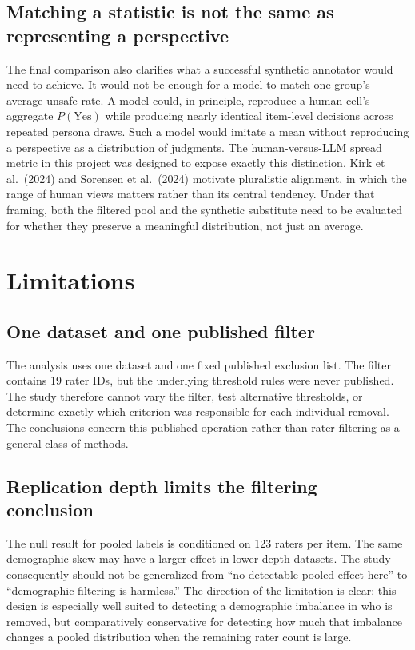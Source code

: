 \documentclass[11pt,a4paper]{article}
\begin{document}
\subsection{Matching a statistic is not the same as representing a perspective}

The final comparison also clarifies what a successful synthetic annotator would need to achieve.
It would not be enough for a model to match one group's average unsafe rate. A model could, in
principle, reproduce a human cell's aggregate $P(\text{Yes})$ while producing nearly identical
item-level decisions across repeated persona draws. Such a model would imitate a mean without
reproducing a perspective as a distribution of judgments. The human-versus-LLM spread metric in
this project was designed to expose exactly this distinction. Kirk et al.\ (2024) and
Sorensen et al.\ (2024) motivate pluralistic alignment, in which the range of human views
matters rather than its central tendency. Under that framing, both the filtered pool and the synthetic
substitute need to be evaluated for whether they preserve a meaningful distribution, not just an
average.

\section{Limitations}

\subsection{One dataset and one published filter}
The analysis uses one dataset and one fixed published exclusion list. The filter contains 19
rater IDs, but the underlying threshold rules were never published. The study therefore cannot
vary the filter, test alternative thresholds, or determine exactly which
criterion was responsible for each individual removal. The conclusions concern this published
operation rather than rater filtering as a general class of methods.

\subsection{Replication depth limits the filtering conclusion}
The null result for pooled labels is conditioned on 123 raters per item. The same demographic
skew may have a larger effect in lower-depth datasets. The study consequently should not be
generalized from ``no detectable pooled effect here'' to ``demographic filtering is harmless.''
The direction of the limitation is clear: this design is especially well suited to detecting a
demographic imbalance in who is removed, but comparatively conservative for detecting how much
that imbalance changes a pooled distribution when the remaining rater count is large.
\end{document}
